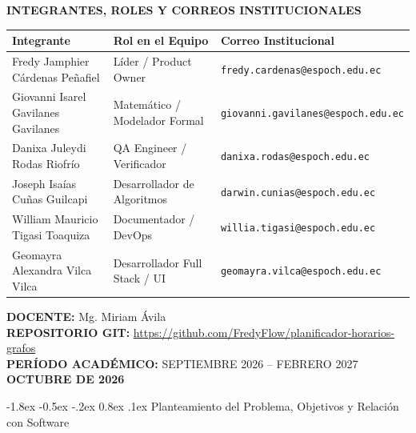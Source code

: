 \documentclass[12pt,a4paper]{article}
\makeatletter
\renewcommand\section{\@startsection {section}{1}{\z@}%
                                   {-1.8ex \@plus -0.5ex \@minus -.2ex}%
                                   {0.8ex \@plus.1ex}%
                                   {\normalfont\large\bfseries}}
\theoremstyle{definition}
\makeatother
\begin{document}
\begin{titlepage}
    \begin{singlespace}
    \footnotesize
    \textbf{INTEGRANTES, ROLES Y CORREOS INSTITUCIONALES}\\[0.18cm]
    \setlength{\tabcolsep}{5pt}
    \renewcommand{\arraystretch}{1.28}
    \begin{tabularx}{\textwidth}{|L{4.8cm}|L{4.3cm}|Y|}
        \hline
        \textbf{Integrante} & \textbf{Rol en el Equipo} & \textbf{Correo Institucional} \\ \hline
        Fredy Jamphier Cárdenas Peñafiel & Líder / Product Owner & \nolinkurl{fredy.cardenas@espoch.edu.ec} \\ \hline
        Giovanni Isarel Gavilanes Gavilanes & Matemático / Modelador Formal & \nolinkurl{giovanni.gavilanes@espoch.edu.ec} \\ \hline
        Danixa Juleydi Rodas Riofrío & QA Engineer / Verificador & \nolinkurl{danixa.rodas@espoch.edu.ec} \\ \hline
        Joseph Isaías Cuñas Guilcapi & Desarrollador de Algoritmos & \nolinkurl{darwin.cunias@espoch.edu.ec} \\ \hline
        William Mauricio Tigasi Toaquiza & Documentador / DevOps & \nolinkurl{willia.tigasi@espoch.edu.ec} \\ \hline
        Geomayra Alexandra Vilca Vilca & Desarrollador Full Stack / UI & \nolinkurl{geomayra.vilca@espoch.edu.ec} \\ \hline
    \end{tabularx}
    \end{singlespace}

    \vspace{0.5cm}
    \begin{singlespace}
    {\small \textbf{DOCENTE:} Mg. Miriam Ávila}\\[0.15cm]
    {\small \textbf{REPOSITORIO GIT:} \url{https://github.com/FredyFlow/planificador-horarios-grafos}}\\[0.15cm]
    {\small \textbf{PERÍODO ACADÉMICO:} SEPTIEMBRE 2026 -- FEBRERO 2027}\\[0.12cm]
    {\small \textbf{OCTUBRE DE 2026}}
    \end{singlespace}
\end{titlepage}

\section{Planteamiento del Problema, Objetivos y Relación con Software}
\end{document}
